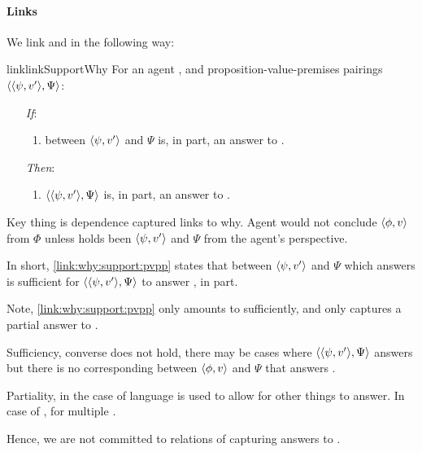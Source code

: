 \paragraph{Links}

\begin{note}
  We link \qWhyV{} and \qWhy{} in the following way:

  \begin{restatable}{link}{linkSupportWhy}
    \label{link:why:support:pvpp}
    For an agent \vAgent{}, and proposition-value-premises pairings \(\langle \langle \psi, v' \rangle, \Psi \rangle\):

    \begin{itemize}
    \item[\emph{If}:]
      \begin{enumerate}[label=\alph*., ref=(\alph*)]
      \item
         between \(\langle \psi, v' \rangle\) and \(\Psi\) is, in part, an answer to \qWhyV{}.
      \end{enumerate}
    \item[\emph{Then}:]
      \begin{enumerate}[label=\alph*., ref=(\alph*), resume]
      \item
        \(\langle \langle \psi, v' \rangle, \Psi \rangle\) is, in part, an answer to \qWhy{}.
      \end{enumerate}
    \end{itemize}
    \vspace{-\baselineskip}
  \end{restatable}

  Key thing is dependence captured links to why.
  Agent would not conclude \(\langle \phi, v \rangle\) from \(\Phi\) unless \ros{} holds been \(\langle \psi, v' \rangle\) and \(\Psi\) from the agent's perspective.

  

  In short, \autoref{link:why:support:pvpp} states that \support{} between \(\langle \psi, v' \rangle\) and \(\Psi\) which answers \qWhyV{} is sufficient for \(\langle \langle \psi, v' \rangle, \Psi \rangle\) to answer \qWhy{}, in part.

  Note, \autoref{link:why:support:pvpp} only amounts to sufficiently, and only captures a partial answer to \qWhy{}.

  Sufficiency, converse does not hold, there may be cases where \(\langle \langle \psi, v' \rangle, \Psi \rangle\) answers \qWhy{} but there is no corresponding \ros{} between \(\langle \phi, v \rangle\) and \(\Psi\) that answers \qWhyV{}.

  Partiality, in the case of \qWhy{}  language is used to allow for other things to answer.
  In case of \qWhyV{}, for multiple \ros{}.

  Hence, we are not committed to relations of \support{} capturing answers to \qWhy{}.
\end{note}

